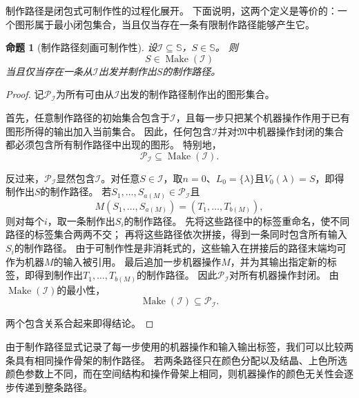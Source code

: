 \documentclass[UTF8,fontset=none]{ctexart}
\theoremstyle{cnthm}
\newtheorem{proposition}{命题}[section]
\begin{document}
			制作路径是闭包式可制作性的过程化展开。
			下面说明，这两个定义是等价的：一个图形属于最小闭包集合，当且仅当存在一条有限制作路径能够产生它。
			
			\begin{proposition}[制作路径刻画可制作性]\label{prop:make-path-characterization}
				设$\mathcal{I}\subseteq\mathbb{S}$，$S\in\mathbb{S}$。
				则
				$$
				S\in\operatorname{Make}(\mathcal{I})
				$$
				当且仅当存在一条从$\mathcal{I}$出发并制作出$S$的制作路径。
			\end{proposition}
			
			\begin{proof}
				记$\mathcal{P}_{\mathcal{I}}$为所有可由从$\mathcal{I}$出发的制作路径制作出的图形集合。
				
				首先，任意制作路径的初始集合包含于$\mathcal{I}$，且每一步只把某个机器操作作用于已有图形所得的输出加入当前集合。
				因此，任何包含$\mathcal{I}$并对$\mathfrak{M}$中机器操作封闭的集合都必须包含所有制作路径中出现的图形。
				特别地，
				$$
				\mathcal{P}_{\mathcal{I}}\subseteq\operatorname{Make}(\mathcal{I}).
				$$
				
				反过来，$\mathcal{P}_{\mathcal{I}}$显然包含$\mathcal{I}$。对任意$S\in\mathcal{I}$，取$n=0$、$L_0=\{\lambda\}$且$V_0(\lambda)=S$，即得制作出$S$的制作路径。
				若$S_1,\dots,S_{a(M)}\in\mathcal{P}_{\mathcal{I}}$且
				$$
				M(S_1,\dots,S_{a(M)})=(T_1,\dots,T_{b(M)}),
				$$
				则对每个$i$，取一条制作出$S_i$的制作路径。
				先将这些路径中的标签重命名，使不同路径的标签集合两两不交；
				再将这些路径依次拼接，得到一条同时包含所有输入$S_i$的制作路径。
				由于可制作性是非消耗式的，这些输入在拼接后的路径末端均可作为机器$M$的输入被引用。
				最后追加一步机器操作$M$，并为其输出指定新的标签，即得到制作出$T_1,\dots,T_{b(M)}$的制作路径。
				因此$\mathcal{P}_{\mathcal{I}}$对所有机器操作封闭。
				由$\operatorname{Make}(\mathcal{I})$的最小性，
				$$
				\operatorname{Make}(\mathcal{I})\subseteq\mathcal{P}_{\mathcal{I}}.
				$$
				
				两个包含关系合起来即得结论。
			\end{proof}
			
			由于制作路径显式记录了每一步使用的机器操作和输入输出标签，我们可以比较两条具有相同操作骨架的制作路径。
			若两条路径只在颜色分配以及结晶、上色所选颜色参数上不同，而在空间结构和操作骨架上相同，则机器操作的颜色无关性会逐步传递到整条路径。
			
\end{document}
